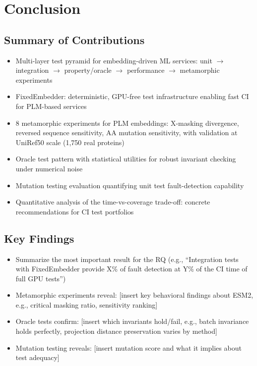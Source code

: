 
\chapter{Conclusion}\label{chapter:conclusion}


\section{Summary of Contributions}\label{sec:contributions-summary}
\begin{itemize}
  \item Multi-layer test pyramid for embedding-driven ML services: unit $\to$ integration $\to$ property/oracle $\to$ performance $\to$ metamorphic experiments
  \item FixedEmbedder: deterministic, GPU-free test infrastructure enabling fast CI for PLM-based services
  \item 8 metamorphic experiments for PLM embeddings: X-masking divergence, reversed sequence sensitivity, AA mutation sensitivity, with validation at UniRef50 scale (1,750 real proteins)
  \item Oracle test pattern with statistical utilities for robust invariant checking under numerical noise
  \item Mutation testing evaluation quantifying unit test fault-detection capability
  \item Quantitative analysis of the time-vs-coverage trade-off: concrete recommendations for CI test portfolios
\end{itemize}

\section{Key Findings}\label{sec:key-findings}
\begin{itemize}
  \item Summarize the most important result for the RQ (e.g., ``Integration tests with FixedEmbedder provide X\% of fault detection at Y\% of the CI time of full GPU tests'')
  \item Metamorphic experiments reveal: [insert key behavioral findings about ESM2, e.g., critical masking ratio, sensitivity ranking]
  \item Oracle tests confirm: [insert which invariants hold/fail, e.g., batch invariance holds perfectly, projection distance preservation varies by method]
  \item Mutation testing reveals: [insert mutation score and what it implies about test adequacy]
\end{itemize}

